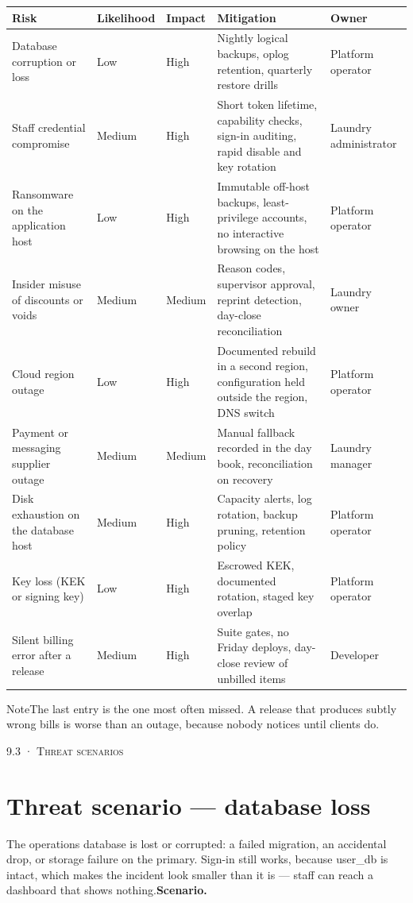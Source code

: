 \documentclass[11pt,a4paper,oneside]{book}
\begin{document}
\begin{center}\small
\begin{tabularx}{\linewidth}{|X|X|X|X|X|}
\hline
\rowcolor{lightgrey}
\textbf{Risk} & \textbf{Likelihood} & \textbf{Impact} & \textbf{Mitigation} & \textbf{Owner} \\ \hline
Database corruption or loss & Low & High & Nightly logical backups, oplog retention, quarterly restore drills & Platform operator \\ \hline
Staff credential compromise & Medium & High & Short token lifetime, capability checks, sign-in auditing, rapid disable and key rotation & Laundry administrator \\ \hline
Ransomware on the application host & Low & High & Immutable off-host backups, least-privilege accounts, no interactive browsing on the host & Platform operator \\ \hline
Insider misuse of discounts or voids & Medium & Medium & Reason codes, supervisor approval, reprint detection, day-close reconciliation & Laundry owner \\ \hline
Cloud region outage & Low & High & Documented rebuild in a second region, configuration held outside the region, DNS switch & Platform operator \\ \hline
Payment or messaging supplier outage & Medium & Medium & Manual fallback recorded in the day book, reconciliation on recovery & Laundry manager \\ \hline
Disk exhaustion on the database host & Medium & High & Capacity alerts, log rotation, backup pruning, retention policy & Platform operator \\ \hline
Key loss (KEK or signing key) & Low & High & Escrowed KEK, documented rotation, staged key overlap & Platform operator \\ \hline
Silent billing error after a release & Medium & High & Suite gates, no Friday deploys, day-close review of unbilled items & Developer \\ \hline
\end{tabularx}
\end{center}
\begin{notebox}NoteThe last entry is the one most often missed. A release that produces subtly wrong bills is worse than an outage, because nobody notices until clients do.\end{notebox}
\textsc{\small\color{crimson}9.3 · Threat scenarios}\par\medskip
\section*{Threat scenario — database loss}
The operations database is lost or corrupted: a failed migration, an accidental drop, or storage failure on the primary. Sign-in still works, because user\_db is intact, which makes the incident look smaller than it is — staff can reach a dashboard that shows nothing.\textbf{Scenario.}
\end{document}
